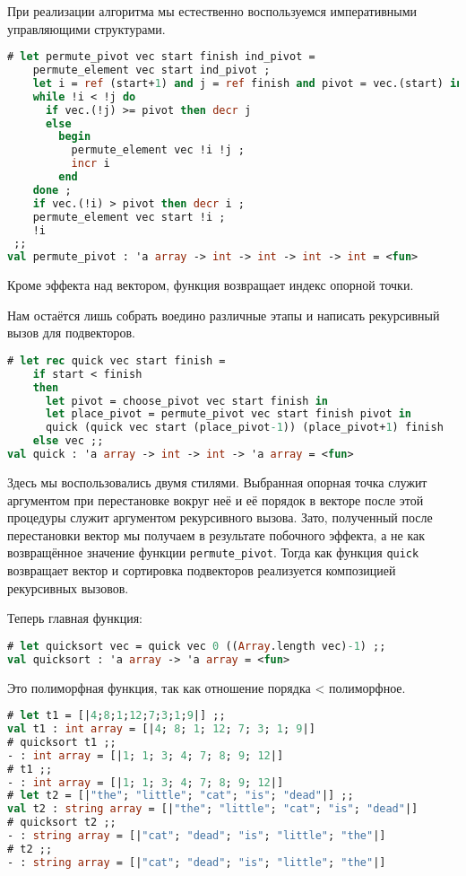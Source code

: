 При реализации алгоритма мы естественно воспользуемся императивными управляющими
структурами.

\begin{lstlisting}[language=OCaml]
# let permute_pivot vec start finish ind_pivot =
    permute_element vec start ind_pivot ;
    let i = ref (start+1) and j = ref finish and pivot = vec.(start) in
    while !i < !j do
      if vec.(!j) >= pivot then decr j
      else
        begin
          permute_element vec !i !j ;
          incr i
        end
    done ;
    if vec.(!i) > pivot then decr i ;
    permute_element vec start !i ;
    !i
 ;;
val permute_pivot : 'a array -> int -> int -> int -> int = <fun>
\end{lstlisting}

Кроме эффекта над вектором, функция возвращает индекс опорной точки.

Нам остаётся лишь собрать воедино различные этапы и написать рекурсивный вызов
для подвекторов.

\begin{lstlisting}[language=OCaml]
# let rec quick vec start finish =
    if start < finish
    then
      let pivot = choose_pivot vec start finish in
      let place_pivot = permute_pivot vec start finish pivot in
      quick (quick vec start (place_pivot-1)) (place_pivot+1) finish
    else vec ;;
val quick : 'a array -> int -> int -> 'a array = <fun>
\end{lstlisting}

Здесь мы воспользовались двумя стилями. Выбранная опорная точка служит
аргументом при перестановке вокруг неё и её порядок в векторе после этой
процедуры служит аргументом рекурсивного вызова. Зато, полученный после
перестановки вектор мы получаем в результате побочного эффекта, а не как
возвращённое значение функции \texttt{permute\_pivot}. Тогда как функция
\texttt{quick} возвращает вектор и сортировка подвекторов реализуется
композицией рекурсивных вызовов.

Теперь главная функция:

\begin{lstlisting}[language=OCaml]
# let quicksort vec = quick vec 0 ((Array.length vec)-1) ;;
val quicksort : 'a array -> 'a array = <fun>
\end{lstlisting}

Это полиморфная функция, так как отношение порядка < полиморфное.

\begin{lstlisting}[language=OCaml]
# let t1 = [|4;8;1;12;7;3;1;9|] ;;
val t1 : int array = [|4; 8; 1; 12; 7; 3; 1; 9|]
# quicksort t1 ;;
- : int array = [|1; 1; 3; 4; 7; 8; 9; 12|]
# t1 ;;
- : int array = [|1; 1; 3; 4; 7; 8; 9; 12|]
# let t2 = [|"the"; "little"; "cat"; "is"; "dead"|] ;;
val t2 : string array = [|"the"; "little"; "cat"; "is"; "dead"|]
# quicksort t2 ;;
- : string array = [|"cat"; "dead"; "is"; "little"; "the"|]
# t2 ;;
- : string array = [|"cat"; "dead"; "is"; "little"; "the"|]
\end{lstlisting}

